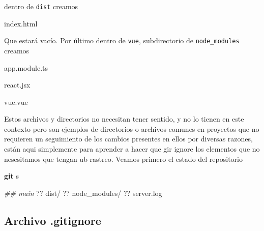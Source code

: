 \documentclass[
]{book}
\newenvironment{Shaded}{\begin{snugshade}}{\end{snugshade}}
\newcommand{\CommentTok}[1]{\textcolor[rgb]{0.56,0.35,0.01}{\textit{#1}}}
\newcommand{\ExtensionTok}[1]{#1}
\newcommand{\FunctionTok}[1]{\textcolor[rgb]{0.13,0.29,0.53}{\textbf{#1}}}
\newcommand{\NormalTok}[1]{#1}
\begin{document}
dentro de \texttt{dist} creamos

\begin{Shaded}
\begin{Highlighting}[]
\ExtensionTok{index.html}
\end{Highlighting}
\end{Shaded}

Que estará vacío.
Por último dentro de \texttt{vue}, subdirectorio de \texttt{node\_modules} creamos

\begin{Shaded}
\begin{Highlighting}[]
\ExtensionTok{app.module.ts}
\end{Highlighting}
\end{Shaded}

\begin{Shaded}
\begin{Highlighting}[]
\ExtensionTok{react.jsx}
\end{Highlighting}
\end{Shaded}

\begin{Shaded}
\begin{Highlighting}[]
\ExtensionTok{vue.vue}
\end{Highlighting}
\end{Shaded}

Estos archivos y directorios no necesitan tener sentido, y no lo tienen en este contexto pero son ejemplos de directorios o archivos comunes en proyectos que no requieren un seguimiento de los cambios presentes en ellos por diversas razones, están aqui simplemente para aprender a hacer que gir ignore los elementos que no nesesitamos que tengan ub rastreo.
Veamos primero el estado del repositorio

\begin{Shaded}
\begin{Highlighting}[]
\FunctionTok{git}\NormalTok{ s}
\end{Highlighting}
\end{Shaded}

\begin{Shaded}
\begin{Highlighting}[]
\CommentTok{\#\# main}
\ExtensionTok{??}\NormalTok{ dist/}
\ExtensionTok{??}\NormalTok{ node\_modules/}
\ExtensionTok{??}\NormalTok{ server.log}
\end{Highlighting}
\end{Shaded}

\subsection{Archivo .gitignore}\label{archivo-.gitignore}
\end{document}

